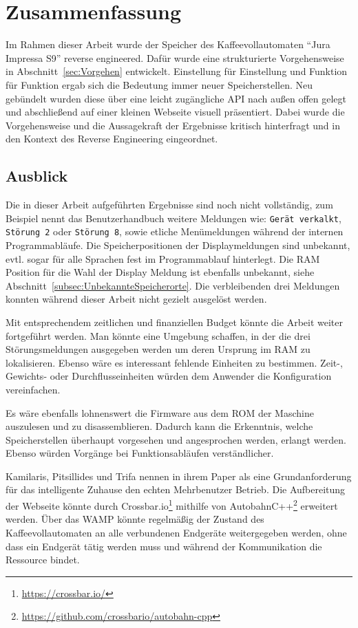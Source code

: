 \chapter{Zusammenfassung}\label{ch:Zusammenfassung}
Im Rahmen dieser Arbeit wurde der Speicher des Kaffeevollautomaten "`Jura Impressa S9"' reverse engineered.
Dafür wurde eine strukturierte Vorgehensweise in Abschnitt~\ref{sec:Vorgehen} entwickelt.
Einstellung für Einstellung und Funktion für Funktion ergab sich die Bedeutung immer neuer Speicherstellen.
Neu gebündelt wurden diese über eine leicht zugängliche \ac{API} nach außen offen gelegt und abschließend auf einer kleinen Webseite visuell präsentiert.
Dabei wurde die Vorgehensweise und die Aussagekraft der Ergebnisse kritisch hinterfragt und in den Kontext des Reverse Engineering eingeordnet.

\section{Ausblick}
Die in dieser Arbeit aufgeführten Ergebnisse sind noch nicht vollständig, zum Beispiel nennt das Benutzerhandbuch weitere Meldungen wie:\label{FehlendeMeldungen}
\texttt{Gerät verkalkt}, \texttt{Störung 2} oder \texttt{Störung 8}, sowie etliche Menümeldungen während der internen Programmabläufe.
Die Speicherpositionen der Displaymeldungen sind unbekannt, evtl. sogar für alle Sprachen fest im Programmablauf hinterlegt.
Die \ac{RAM} Position für die Wahl der Display Meldung ist ebenfalls unbekannt, siehe Abschnitt~\ref{subsec:UnbekannteSpeicherorte}. 
Die verbleibenden drei Meldungen konnten während dieser Arbeit nicht gezielt ausgelöst werden.

Mit entsprechendem zeitlichen und finanziellen Budget könnte die Arbeit weiter fortgeführt werden.
Man könnte eine Umgebung schaffen, in der die drei Störungsmeldungen ausgegeben werden um deren Ursprung im \ac{RAM} zu lokalisieren.
Ebenso wäre es interessant fehlende Einheiten zu bestimmen.
Zeit-, Gewichts- oder Durchflusseinheiten würden dem Anwender die Konfiguration vereinfachen.

Es wäre ebenfalls lohnenswert die Firmware aus dem \ac{ROM} der Maschine auszulesen und zu disassemblieren.
Dadurch kann die Erkenntnis, welche Speicherstellen überhaupt vorgesehen und angesprochen werden, erlangt werden.
Ebenso würden Vorgänge bei Funktionsabläufen verständlicher.

Kamilaris, Pitsillides und Trifa nennen in ihrem Paper \cite{Kamilaris2011} als eine Grundanforderung für das intelligente Zuhause den echten Mehrbenutzer Betrieb.
Die Aufbereitung der Webseite könnte durch Crossbar.io\footnote{\url{https://crossbar.io/}} mithilfe von AutobahnC++\footnote{\url{https://github.com/crossbario/autobahn-cpp}} erweitert werden.
Über das \ac{WAMP} könnte regelmäßig der Zustand des Kaffeevollautomaten an alle verbundenen Endgeräte weitergegeben werden, ohne dass ein Endgerät tätig werden muss und während der Kommunikation die Ressource bindet.
